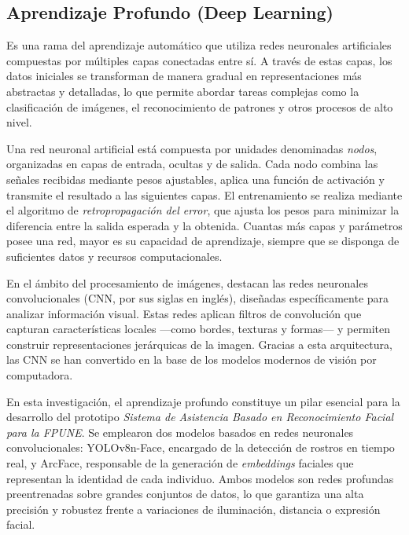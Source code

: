 \subsection{Aprendizaje Profundo (Deep Learning)}

Es una rama del aprendizaje automático que utiliza redes neuronales artificiales compuestas por múltiples capas conectadas entre sí. A través de estas capas, los datos iniciales se transforman de manera gradual en representaciones más abstractas y detalladas, lo que permite abordar tareas complejas como la clasificación de imágenes, el reconocimiento de patrones y otros procesos de alto nivel\cite{perez2021,awsDeepLearning}.

Una red neuronal artificial está compuesta por unidades denominadas \textit{nodos}, organizadas en capas de entrada, ocultas y de salida. Cada nodo combina las señales recibidas mediante pesos ajustables, aplica una función de activación y transmite el resultado a las siguientes capas. El entrenamiento se realiza mediante el algoritmo de \textit{retropropagación del error}, que ajusta los pesos para minimizar la diferencia entre la salida esperada y la obtenida. Cuantas más capas y parámetros posee una red, mayor es su capacidad de aprendizaje, siempre que se disponga de suficientes datos y recursos computacionales.

En el ámbito del procesamiento de imágenes, destacan las redes neuronales convolucionales (CNN, por sus siglas en inglés), diseñadas específicamente para analizar información visual. Estas redes aplican filtros de convolución que capturan características locales —como bordes, texturas y formas— y permiten construir representaciones jerárquicas de la imagen. Gracias a esta arquitectura, las CNN se han convertido en la base de los modelos modernos de visión por computadora.

En esta investigación, el aprendizaje profundo constituye un pilar esencial para la desarrollo del prototipo \textit{Sistema de Asistencia Basado en Reconocimiento Facial para la FPUNE}. Se emplearon dos modelos basados en redes neuronales convolucionales: YOLOv8n-Face, encargado de la detección de rostros en tiempo real, y ArcFace, responsable de la generación de \textit{embeddings} faciales que representan la identidad de cada individuo. Ambos modelos son redes profundas preentrenadas sobre grandes conjuntos de datos, lo que garantiza una alta precisión y robustez frente a variaciones de iluminación, distancia o expresión facial\cite{urgel2021}.

